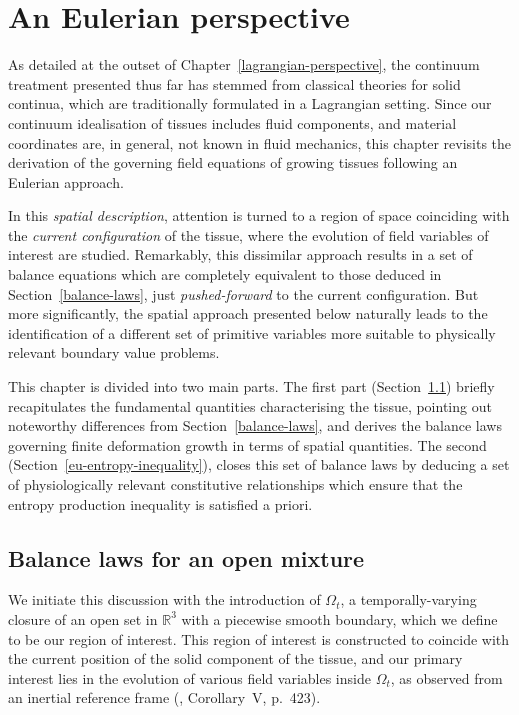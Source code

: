 \chapter{An Eulerian perspective}
\label{eulerian-perspective}

As detailed at the outset of Chapter~\ref{lagrangian-perspective}, the
continuum treatment presented thus far has stemmed from classical
theories for solid continua, which are traditionally formulated in a
Lagrangian setting. Since our continuum idealisation of tissues
includes fluid components, and material coordinates are, in general,
not known in fluid mechanics, this chapter revisits the derivation of
the governing field equations of growing tissues following an Eulerian
approach.

In this {\em spatial description}, attention is turned to a region of
space coinciding with the {\em current configuration} of the tissue,
where the evolution of field variables of interest are
studied. Remarkably, this dissimilar approach results in a set of
balance equations which are completely equivalent to those deduced in
Section~\ref{balance-laws}, just {\em pushed-forward} to the current
configuration. But more significantly, the spatial approach presented
below naturally leads to the identification of a different set of
primitive variables more suitable to physically relevant boundary
value problems.

This chapter is divided into two main parts. The first part
(Section~\ref{eu-balance-laws}) briefly recapitulates the fundamental
quantities characterising the tissue, pointing out noteworthy
differences from Section~\ref{balance-laws}, and derives the balance
laws governing finite deformation growth in terms of spatial
quantities. The second (Section~\ref{eu-entropy-inequality}), closes
this set of balance laws by deducing a set of physiologically relevant
constitutive relationships which ensure that the entropy production
inequality is satisfied a priori.

\section{Balance laws for an open mixture}
\label{eu-balance-laws}

We initiate this discussion with the introduction of $\Omega_{t}$, a
temporally-varying closure of an open set in $\mathbb{R}^{3}$ with a
piecewise smooth boundary, which we define to be our region of
interest. This region of interest is constructed to coincide with the
current position of the solid component of the tissue, and our primary
interest lies in the evolution of various field variables inside
$\Omega_{t}$, as observed from an inertial reference frame
(\citet{newton1726}, Corollary~V, p.~423).

